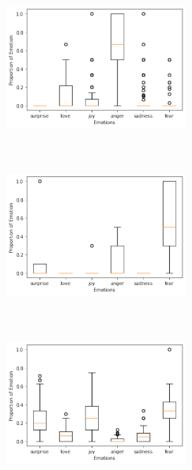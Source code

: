 \documentclass[acmtog]{acmart}
\begin{document}
\begin{figure}[h]
  \begin{minipage}{.33\textwidth}
    \centering
    \includegraphics[width=6cm,height=5.5cm,keepaspectratio]{plots/dis_anger.pdf}
  \end{minipage}%
  \begin{minipage}{.33\textwidth}
    \centering
    \includegraphics[width=6cm,height=5.5cm,keepaspectratio]{plots/dis_fear.pdf}
  \end{minipage}%
  \begin{minipage}{.33\textwidth}
    \centering
    \includegraphics[width=6cm,height=5.5cm,keepaspectratio]{plots/dis_joy.pdf}
  \end{minipage}
 \medskip
  \begin{minipage}{.33\textwidth}
    \centering

\end{minipage}
\end{figure}
\end{document}

